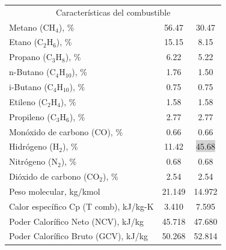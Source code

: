 \begin{table}[H]
\begin{tabular}{l|c|c}
\multicolumn{3}{c}{Características del combustible} \\
Metano (CH$_4$), \%          &56.47  &30.47  \\
Etano (C$_2$H$_6$), \%       &15.15  &8.15   \\
Propano (C$_3$H$_8$), \%     &6.22   &5.22   \\
n-Butano (C$_4$H$_{10}$), \% &1.76   &1.50   \\
i-Butano (C$_4$H$_{10}$), \% &0.75   &0.75   \\
Etileno (C$_2$H$_4$), \%     &1.58   &1.58   \\
Propileno (C$_3$H$_6$), \%   &2.77   &2.77   \\
Monóxido de carbono (CO), \% &0.66   &0.66   \\
Hidrógeno (H$_2$), \% &11.42&\colorbox{lightgray}{45.68}\\
Nitrógeno (N$_2$), \%        &0.68   &0.68   \\
Dióxido de carbono (CO$_2$), \%&2.54 &2.54   \\
\hline
Peso molecular,  kg/kmol               &21.149 &14.972 \\
Calor específico Cp (T comb),  kJ/kg-K &3.410  &7.595  \\
Poder Calorífico Neto (NCV),  kJ/kg    &45.718 &47.680 \\
Poder Calorífico Bruto (GCV),  kJ/kg   &50.268 &52.814 \\
\end{tabular}
\end{table}

